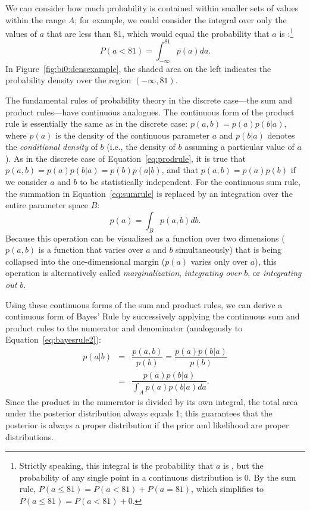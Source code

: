 We can consider how much probability is contained within smaller sets of values within the range $A$; for example, we could consider the integral over only the values of $a$ {that are less than 81}, which would equal the probability that $a$ is :\footnote{Strictly speaking, this integral is the probability that $a$ is , but the probability of any single point in a continuous distribution is 0. By the sum rule, $P(a \leq 81) = P(a < 81) + P(a = 81)$, which simplifies to $P(a \leq 81) = P(a < 81) + 0$.}$$P(a < 81) = \int_{-\infty}^{81} p(a)da.$$ {In Figure~\ref{fig:bi0:densexample}, the shaded area on the left indicates the probability density over the region $(-\infty, 81)$.}

The fundamental rules of probability theory in the discrete case---the sum and product rules---have continuous analogues. The continuous form of the product rule is essentially the same as in the discrete case: $p(a,b) = p(a)p(b|a)$, where $p(a)$ is the density of the continuous parameter $a$ and $p(b|a)$ denotes the \textit{conditional density} of $b$ (i.e., the density of $b$ assuming a particular value of $a$). As in the discrete case of Equation~\ref{eq:prodrule}, it is true that $p(a,b) = p(a)p(b|a) = p(b)p(a|b)$, and that $p(a,b)=p(a)p(b)$ if we consider $a$ and $b$ to be statistically independent. For the continuous sum rule, the summation in Equation~\ref{eq:sumrule} is replaced by an integration over the entire parameter space $B$: $$p(a) = \int_B p(a,b)db.$$ Because this operation can be visualized as a function over two dimensions ($p(a,b)$ is a function that varies over $a$ and $b$ simultaneously) that is being collapsed into the one-dimensional margin ($p(a)$ varies only over $a$), this operation is alternatively called \emph{marginalization}, \emph{integrating over $b$}, or \emph{integrating out $b$}.

Using these continuous forms of the sum and product rules, we can derive a continuous form of Bayes' Rule by successively applying the continuous sum and product rules to the numerator and denominator (analogously to Equation~\ref{eq:bayesrule2}):
\begin{equation}
\begin{array}{rcl}
p(a|b) &=& \dfrac{p(a,b)}{p(b)} = \dfrac{p(a)p(b|a)}{p(b)}\\[3ex]
&=& \dfrac{p(a)p(b|a)}{\int_A p(a)p(b|a)da}.
\end{array}
\label{eq:bayesrule3}
\end{equation}
{Since the product in the numerator is divided by its own integral, the total area under the posterior distribution always equals 1; this guarantees that the posterior is always a proper distribution if the prior and likelihood are proper distributions.}

